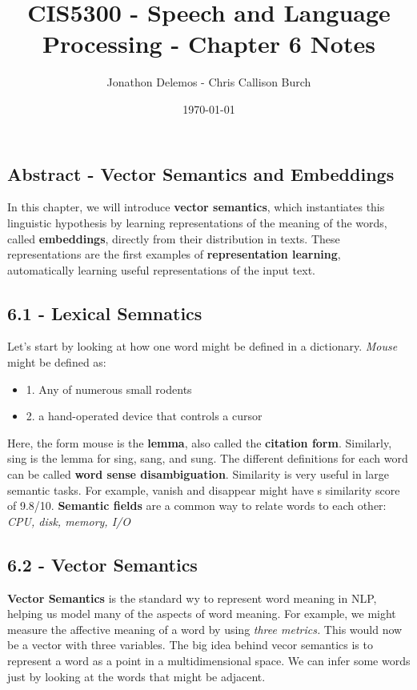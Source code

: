\documentclass{article}
\title{CIS5300 - Speech and Language Processing - Chapter 6 Notes}
\author{Jonathon Delemos - Chris Callison Burch}
\date{\today}
\begin{document}
\maketitle

\subsection{Abstract - Vector Semantics and Embeddings}

In this chapter, we will introduce \textbf{vector semantics}, which instantiates this linguistic hypothesis by learning representations of the meaning
of the words, called \textbf{embeddings}, directly from their distribution in texts. These representations are the first examples of
\textbf{representation learning}, automatically learning useful representations of the input text.

\subsection{6.1 - Lexical Semnatics}

Let's start by looking at how one word might be defined in a dictionary. \textit{Mouse} might be defined as:

\begin{itemize}
    \item 1. Any of numerous small rodents
    \item 2. a hand-operated device that controls a cursor
\end{itemize}

Here, the form mouse is the \textbf{lemma}, also called the \textbf{citation form}. Similarly, sing is the lemma for sing, sang, and sung.
The different definitions for each word can be called \textbf{word sense disambiguation}. Similarity is
very useful in large semantic tasks. For example, vanish and disappear might have s similarity score of 9.8/10.
\textbf{Semantic fields} are a common way to relate words to each other: \textit{CPU, disk, memory, I/O }

\subsection{6.2 - Vector Semantics}

\textbf{Vector Semantics} is the standard wy to represent word meaning in NLP, helping us model many of the aspects of word meaning. For example, we might
measure the affective meaning of a word by using \textit{three metrics.} This would now be a vector with three variables.
The big idea behind vecor semantics is to represent a word as a point in a multidimensional space. We can infer some words just by looking at the words that might be
adjacent.
\end{document}
